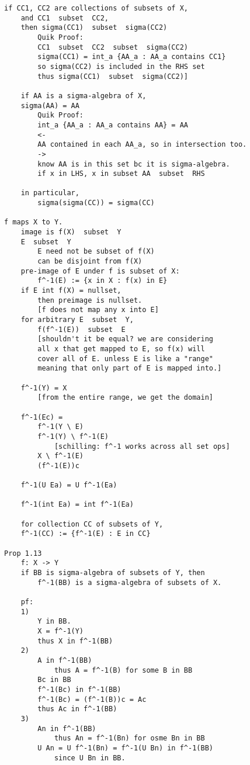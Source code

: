 \documentclass{article}
\begin{document}
\begin{flushleft}
\begin{verbatim}
if CC1, CC2 are collections of subsets of X, 
    and CC1  subset  CC2,
    then sigma(CC1)  subset  sigma(CC2)
        Quik Proof:
        CC1  subset  CC2  subset  sigma(CC2)
        sigma(CC1) = int_a {AA_a : AA_a contains CC1}
        so sigma(CC2) is included in the RHS set
        thus sigma(CC1)  subset  sigma(CC2)]

    if AA is a sigma-algebra of X, 
    sigma(AA) = AA 
        Quik Proof:
        int_a {AA_a : AA_a contains AA} = AA 
        <- 
        AA contained in each AA_a, so in intersection too.
        -> 
        know AA is in this set bc it is sigma-algebra.
        if x in LHS, x in subset AA  subset  RHS 

    in particular, 
        sigma(sigma(CC)) = sigma(CC)

f maps X to Y.
    image is f(X)  subset  Y
    E  subset  Y 
        E need not be subset of f(X)
        can be disjoint from f(X)
    pre-image of E under f is subset of X:
        f^-1(E) := {x in X : f(x) in E}
    if E int f(X) = nullset, 
        then preimage is nullset.
        [f does not map any x into E]
    for arbitrary E  subset  Y,
        f(f^-1(E))  subset  E
        [shouldn't it be equal? we are considering 
        all x that get mapped to E, so f(x) will 
        cover all of E. unless E is like a "range"
        meaning that only part of E is mapped into.]

    f^-1(Y) = X 
        [from the entire range, we get the domain]

    f^-1(Ec) = 
        f^-1(Y \ E)
        f^-1(Y) \ f^-1(E)
            [schilling: f^-1 works across all set ops]
        X \ f^-1(E)
        (f^-1(E))c

    f^-1(U Ea) = U f^-1(Ea)

    f^-1(int Ea) = int f^-1(Ea)

    for collection CC of subsets of Y, 
    f^-1(CC) := {f^-1(E) : E in CC} 
        
Prop 1.13
    f: X -> Y
    if BB is sigma-algebra of subsets of Y, then 
        f^-1(BB) is a sigma-algebra of subsets of X. 

    pf: 
    1) 
        Y in BB.
        X = f^-1(Y)
        thus X in f^-1(BB)
    2)
        A in f^-1(BB)
            thus A = f^-1(B) for some B in BB 
        Bc in BB 
        f^-1(Bc) in f^-1(BB)
        f^-1(Bc) = (f^-1(B))c = Ac 
        thus Ac in f^-1(BB)
    3)
        An in f^-1(BB) 
            thus An = f^-1(Bn) for osme Bn in BB 
        U An = U f^-1(Bn) = f^-1(U Bn) in f^-1(BB)
            since U Bn in BB.


\end{verbatim}
\end{flushleft}
\end{document}
